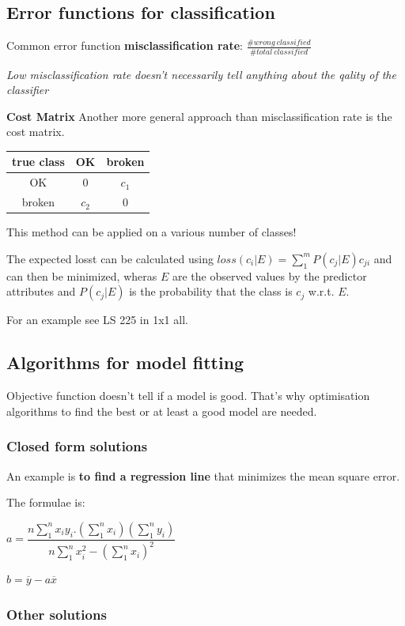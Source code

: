\documentclass[fleqn, oneside, 10pt, titlepage]{article}
\begin{document}
\subsection{Error functions for classification}
Common error function \textbf{misclassification rate}: $\frac{\#wrong \ classified}{\#total \ classified}$

\textit{Low misclassification rate doesn't necessarily tell anything about the qality of the classifier}

\textbf{Cost Matrix}
Another more general approach than misclassification rate is the cost matrix.

\begin{tabular}{|c|c|c|}
\hline true class & OK & broken \\ 
\hline OK & 0 & $c_1$ \\ 
\hline broken & $c_2$ & 0 \\ 
\hline 
\end{tabular} 

This method can be applied on a various number of classes!

The expected losst can be calculated using $loss(c_i | E) = \sum_1^m P(c_j | E) c_{ji}$ and can then be minimized, wheras $E$ are the observed values by the predictor attributes and $P(c_j | E)$ is the probability that the class is $c_j$ w.r.t. $E$.

For an example see LS 225 in 1x1 all.

\subsection{Algorithms for model fitting}
Objective function doesn't tell if a model is good. That's why optimisation algorithms to find the best or at least a good model are needed.
\subsubsection{Closed form solutions}
An example is \textbf{to find a regression line} that minimizes the mean square error.

The formulae is:

$a = \dfrac{n \sum_1^n x_i y_i . (\sum_1^n x_i) (\sum_1^n y_i)}{n \sum_1^n x_i^2 - (\sum_1^n x_i)^2}$

$b = \overline{y} - a\overline{x}$\\

\subsubsection{Other solutions}
\end{document}
